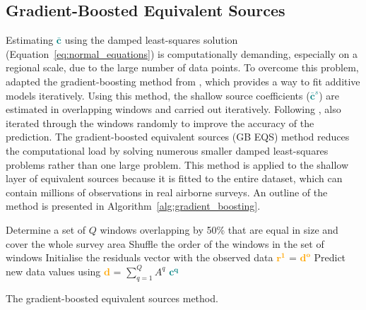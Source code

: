 \subsection{Gradient-Boosted Equivalent Sources}

Estimating \textcolor{teal}{$\bar{\mathbf{c}}$} using the damped least-squares solution (Equation~\ref{eq:normal_equations}) is computationally demanding, especially on a regional scale, due to the large number of data points. 
To overcome this problem, \citet{Soler2021} adapted the gradient-boosting method from \citet{Friedman2001}, which provides a way to fit additive models iteratively. Using this method, the shallow source coefficients (\textcolor{teal}{$\bar{\mathbf{c}}^s$}) are estimated in overlapping windows and carried out iteratively. Following \citet{Friedman2002}, \citet{Soler2021} also iterated through the windows randomly to improve the accuracy of the prediction. 
The gradient-boosted equivalent sources (GB EQS) method reduces the computational load by solving numerous smaller damped least-squares problems rather than one large problem. This method is applied to the shallow layer of equivalent sources because it is fitted to the entire dataset, which can contain millions of observations in real airborne surveys. An outline of the method is presented in Algorithm~\ref{alg:gradient_boosting}.

\clearpage
\begin{algorithm}[!h]
    Determine a set of $Q$ windows overlapping by 50\% that are equal in size and cover the whole survey area
    \;
    Shuffle the order of the windows in the set of windows
    \;
    Initialise the residuals vector with the observed data \textcolor{orange}{$\mathbf{r^1}$} = \textcolor{orange}{$\mathbf{d^o}$}
    \;
    Predict new data values using \textcolor{orange}{$\mathbf{d}$} = $\sum\limits_{q=1}^{Q} A^q$ \textcolor{teal}{$\mathbf{c^q}$}
    \;
    \BlankLine
    \caption{The gradient-boosted equivalent sources method.}
    \label{alg:gradient_boosting}
\end{algorithm}

